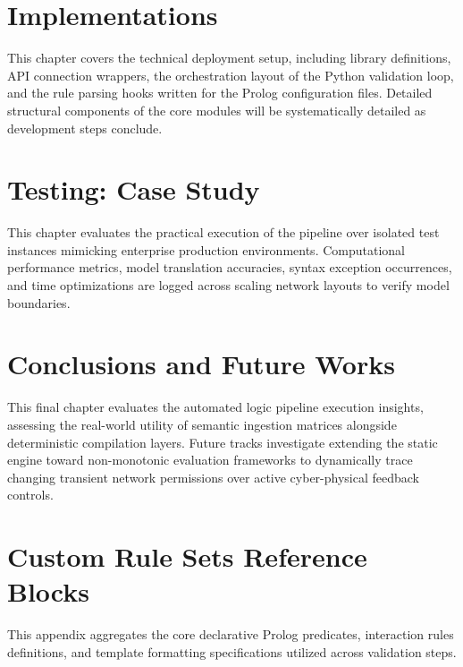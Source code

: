 \documentclass[target=mst,aauheader=aics,style=]{thud}
\begin{document}
\chapter{Implementations}
This chapter covers the technical deployment setup, including library definitions, API connection wrappers, the orchestration layout of the Python validation loop, and the rule parsing hooks written for the Prolog configuration files. Detailed structural components of the core modules will be systematically detailed as development steps conclude.


\chapter{Testing: Case Study}
This chapter evaluates the practical execution of the pipeline over isolated test instances mimicking enterprise production environments. Computational performance metrics, model translation accuracies, syntax exception occurrences, and time optimizations are logged across scaling network layouts to verify model boundaries.


\chapter{Conclusions and Future Works}
This final chapter evaluates the automated logic pipeline execution insights, assessing the real-world utility of semantic ingestion matrices alongside deterministic compilation layers. Future tracks investigate extending the static engine toward non-monotonic evaluation frameworks to dynamically trace changing transient network permissions over active cyber-physical feedback controls.


\appendix

\chapter{Custom Rule Sets Reference Blocks}
This appendix aggregates the core declarative Prolog predicates, interaction rules definitions, and template formatting specifications utilized across validation steps.
\end{document}
